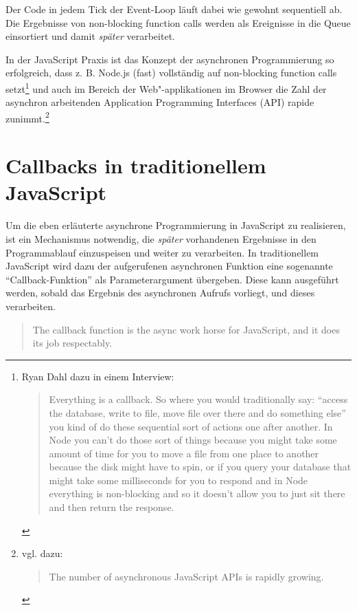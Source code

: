 \documentclass[
11pt, %
a4paper, %
oneside, %
pdfspacing, %
headinclude,
BCOR5mm, %
ngerman, %
bibtotocnumbered,
]{scrartcl}
\begin{document}
	Der Code in jedem Tick der Event-Loop läuft dabei wie gewohnt sequentiell ab. Die Ergebnisse von non-blocking function calls werden als Ereignisse in die Queue einsortiert und damit \emph{später} verarbeitet. 
	
	In der JavaScript Praxis ist das Konzept der asynchronen Programmierung so erfolgreich, dass z. B. Node.js (fast) vollständig auf non-blocking function calls setzt\footnote{Ryan Dahl dazu in einem Interview:~\begin{quote}Everything is a callback. So where you would traditionally say: "`access the database, write to file, move file over there and do something else"' you kind of do these sequential sort of actions one after another. In Node you can't do those sort of things because you might take some amount of time for you to move a file from one place to another because the disk might have to spin, or if you query your database that might take some milliseconds for you to respond and in Node everything is non-blocking and so it doesn't allow you to just sit there and then return the response.~\citep{Dahl.2010}\end{quote}}
	und auch im Bereich der Web"-applikationen im Browser die Zahl der asynchron arbeitenden Application Programming Interfaces (API) rapide zunimmt.\footnote{vgl. dazu: \begin{quote}The number of asynchronous JavaScript APIs is rapidly growing.~\citep[S.~1]{Parker.2015}\end{quote}}


\section{Callbacks in traditionellem \-JavaScript}

	Um die eben erläuterte asynchrone Programmierung in JavaScript zu realisieren, ist ein Mechanismus notwendig, die \emph{später} vorhandenen Ergebnisse in den Programmablauf einzuspeisen und weiter zu verarbeiten. In traditionellem JavaScript wird dazu der aufgerufenen asynchronen Funktion eine sogenannte "`Callback-Funktion"' als Parameterargument übergeben. Diese kann ausgeführt werden, sobald das Ergebnis des asynchronen Aufrufs vorliegt, und dieses verarbeiten. 
	
	\begin{quote}The callback function is the async work horse for JavaScript, and it does its job respectably.~\citep[S.~26]{Simpson.2015}\end{quote}
\end{document}
